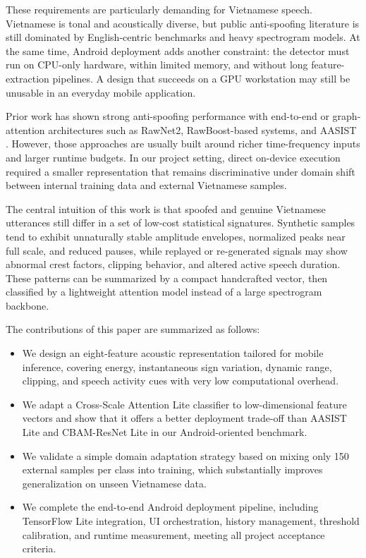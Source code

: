 \documentclass[conference]{IEEEtran}
\begin{document}
These requirements are particularly demanding for Vietnamese speech. Vietnamese is tonal and acoustically diverse, but public anti-spoofing literature is still dominated by English-centric benchmarks and heavy spectrogram models. At the same time, Android deployment adds another constraint: the detector must run on CPU-only hardware, within limited memory, and without long feature-extraction pipelines. A design that succeeds on a GPU workstation may still be unusable in an everyday mobile application.

Prior work has shown strong anti-spoofing performance with end-to-end or graph-attention architectures such as RawNet2, RawBoost-based systems, and AASIST \cite{b1,b2,b3,b4}. However, those approaches are usually built around richer time-frequency inputs and larger runtime budgets. In our project setting, direct on-device execution required a smaller representation that remains discriminative under domain shift between internal training data and external Vietnamese samples.

The central intuition of this work is that spoofed and genuine Vietnamese utterances still differ in a set of low-cost statistical signatures. Synthetic samples tend to exhibit unnaturally stable amplitude envelopes, normalized peaks near full scale, and reduced pauses, while replayed or re-generated signals may show abnormal crest factors, clipping behavior, and altered active speech duration. These patterns can be summarized by a compact handcrafted vector, then classified by a lightweight attention model instead of a large spectrogram backbone.

The contributions of this paper are summarized as follows:
\begin{itemize}
    \item We design an eight-feature acoustic representation tailored for mobile inference, covering energy, instantaneous sign variation, dynamic range, clipping, and speech activity cues with very low computational overhead.
    \item We adapt a Cross-Scale Attention Lite classifier to low-dimensional feature vectors and show that it offers a better deployment trade-off than AASIST Lite and CBAM-ResNet Lite in our Android-oriented benchmark.
    \item We validate a simple domain adaptation strategy based on mixing only 150 external samples per class into training, which substantially improves generalization on unseen Vietnamese data.
    \item We complete the end-to-end Android deployment pipeline, including TensorFlow Lite integration, UI orchestration, history management, threshold calibration, and runtime measurement, meeting all project acceptance criteria.
\end{itemize}
\end{document}
